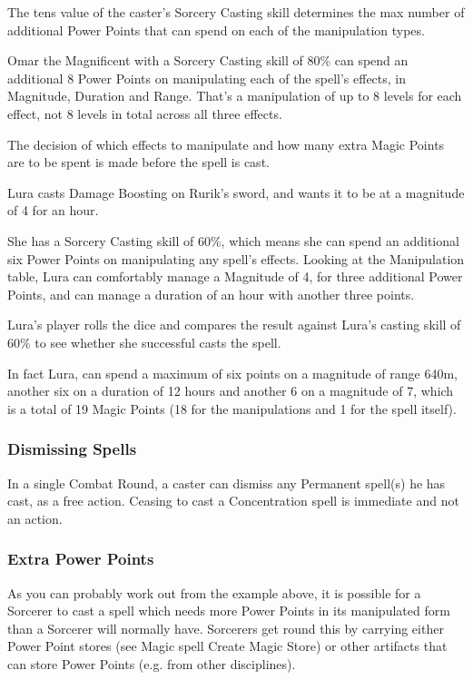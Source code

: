 The tens value of the caster’s Sorcery Casting skill determines the max number of additional Power Points that can spend on each of the manipulation types. 

\begin{rpg-examplebox}
Omar the Magnificent with a Sorcery Casting skill of 80\% can spend an additional 8 Power Points on manipulating each of the spell’s effects, in Magnitude, Duration and Range. That’s a manipulation of up to 8 levels for each effect, not 8 levels in total across all three effects.
\end{rpg-examplebox}

The decision of which effects to manipulate and how many extra Magic Points are to be spent is made before the spell is cast.

\begin{rpg-examplebox}
Lura casts Damage Boosting on Rurik’s sword, and wants it to be at a magnitude of 4 for an hour.

She has a Sorcery Casting skill of 60\%, which means she can spend an additional six Power Points on manipulating any spell’s effects. Looking at the Manipulation table, Lura can comfortably manage a Magnitude of 4, for three additional Power Points, and can manage a duration of an hour with another three points. 

Lura’s player rolls the dice and compares the result against Lura’s casting skill of 60\% to see whether she successful casts the spell.

In fact Lura, can spend a maximum of six points on a magnitude of range 640m, another six on a duration of 12 hours and another 6 on a magnitude of 7, which is a total of 19 Magic Points (18 for the manipulations and 1 for the spell itself).
\end{rpg-examplebox}


\subsubsection{Dismissing Spells}
In a single Combat Round, a caster can dismiss any Permanent spell(s) he has cast, as a free action. Ceasing to cast a Concentration spell is immediate and not an action. 


\subsubsection{Extra Power Points}
As you can probably work out from the example above, it is possible for a Sorcerer to cast a spell which needs more Power Points in its manipulated form than a Sorcerer will normally have. Sorcerers get round this by carrying either Power Point stores (see Magic spell Create Magic Store) or other artifacts that can store Power Points (e.g. from other disciplines).


